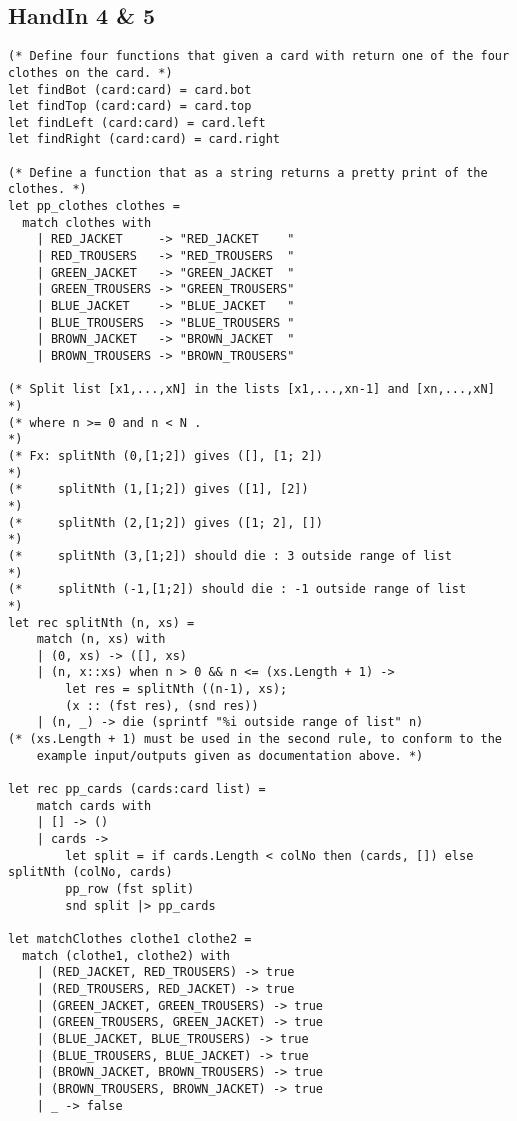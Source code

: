 \subsection{HandIn 4 \& 5}
\label{Appendix_FSharp_Niklas_4and5}
\begin{lstlisting}
(* Define four functions that given a card with return one of the four clothes on the card. *)
let findBot (card:card) = card.bot
let findTop (card:card) = card.top
let findLeft (card:card) = card.left
let findRight (card:card) = card.right

(* Define a function that as a string returns a pretty print of the clothes. *)
let pp_clothes clothes =
  match clothes with
    | RED_JACKET     -> "RED_JACKET    "
    | RED_TROUSERS   -> "RED_TROUSERS  "
    | GREEN_JACKET   -> "GREEN_JACKET  "
    | GREEN_TROUSERS -> "GREEN_TROUSERS"
    | BLUE_JACKET    -> "BLUE_JACKET   "
    | BLUE_TROUSERS  -> "BLUE_TROUSERS "
    | BROWN_JACKET   -> "BROWN_JACKET  "
    | BROWN_TROUSERS -> "BROWN_TROUSERS"

(* Split list [x1,...,xN] in the lists [x1,...,xn-1] and [xn,...,xN] *)
(* where n >= 0 and n < N .                                          *)
(* Fx: splitNth (0,[1;2]) gives ([], [1; 2])                         *)
(*     splitNth (1,[1;2]) gives ([1], [2])                           *)
(*     splitNth (2,[1;2]) gives ([1; 2], [])                         *)
(*     splitNth (3,[1;2]) should die : 3 outside range of list       *)
(*     splitNth (-1,[1;2]) should die : -1 outside range of list     *)
let rec splitNth (n, xs) = 
    match (n, xs) with
    | (0, xs) -> ([], xs)
    | (n, x::xs) when n > 0 && n <= (xs.Length + 1) -> 
        let res = splitNth ((n-1), xs);
        (x :: (fst res), (snd res))
    | (n, _) -> die (sprintf "%i outside range of list" n)
(* (xs.Length + 1) must be used in the second rule, to conform to the 
    example input/outputs given as documentation above. *)

let rec pp_cards (cards:card list) =
    match cards with
    | [] -> ()
    | cards ->
        let split = if cards.Length < colNo then (cards, []) else splitNth (colNo, cards)
        pp_row (fst split)
        snd split |> pp_cards

let matchClothes clothe1 clothe2 =
  match (clothe1, clothe2) with
    | (RED_JACKET, RED_TROUSERS) -> true
    | (RED_TROUSERS, RED_JACKET) -> true
    | (GREEN_JACKET, GREEN_TROUSERS) -> true
    | (GREEN_TROUSERS, GREEN_JACKET) -> true
    | (BLUE_JACKET, BLUE_TROUSERS) -> true
    | (BLUE_TROUSERS, BLUE_JACKET) -> true
    | (BROWN_JACKET, BROWN_TROUSERS) -> true
    | (BROWN_TROUSERS, BROWN_JACKET) -> true
    | _ -> false


\end{lstlisting}
